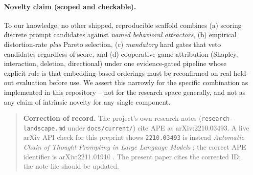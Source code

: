 \paragraph{Novelty claim (scoped and checkable).}
To our knowledge, no other shipped, reproducible scaffold combines (a) scoring
discrete prompt candidates against \emph{named behavioral attractors}, (b)
empirical distortion-rate \emph{plus} Pareto selection, (c) \emph{mandatory} hard
gates that veto candidates regardless of score, and (d) cooperative-game
attribution (Shapley, interaction, deletion, directional) under one
evidence-gated pipeline whose explicit rule is that embedding-based orderings
must be reconfirmed on real held-out evaluation before use. We assert this
narrowly for the specific combination as implemented in this repository -- not
for the research space generally, and not as any claim of intrinsic novelty for
any single component.

\begin{quote}
\textbf{Correction of record.} The project's own research notes
(\texttt{research-landscape.md} under \texttt{docs/current/}) cite APE as
arXiv:2210.03493. A
live arXiv API check for this preprint shows \texttt{2210.03493} is instead
\textit{Automatic Chain of Thought Prompting in Large Language Models}
\citep{zhuosheng2022autocot}; the correct APE identifier is arXiv:2211.01910
\citep{zhou2023ape}. The present paper cites the corrected ID; the note file
should be updated.
\end{quote}